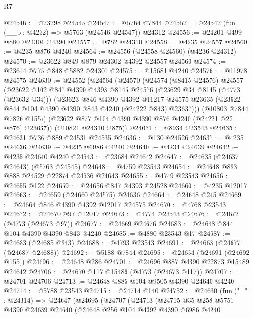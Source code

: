 \begin{lexlean}{R7}
\begin{coremodule}
@24546 := @23298 @24545
@24547 := @5764 @7844
@24552 := @24542 (fun (__b : @4232) => @5763 (@24546 @24547)) @24312
@24556 := @24201 @499 @880 @24304 @4390
@24557 := @782 @24310
@24558 := @4235 @24557
@24560 := @4235 @876 @4240
@24564 := @24556 (@24558 @24560) (@4236 @24312)
@24570 := @23622 @849 @879 @24302 @4392 @24557 @24560
@24574 := @23614 @775 @848 @5882 @24301
@24575 := @15681 @4240
@24576 := @11978 @24575
@24630 := @24552
    (@24564
      (@24570
        (@24574
          (@8415 @24576)
          @24557
          (@23622
            @102
            @847
            @4390
            @4393
            @8145
            @24576
            (@23629 @34 @8145 (@4773 (@23632 @34)))
            (@23623
              @846
              @4390
              @4392
              @11217
              @24575
              @23635
              (@23622 @844 @104 @4390 @4390 @843 @4240 (@24222 @843) @23637)))
          (@10803 @7844 @7826 @155))
        (@23622 @877 @104 @4390 @4390 @876 @4240 (@24221 @22 @876) @23637))
      (@10821 @24310 @875))
@24631 := @8934 @23543
@24635 := @24631 @736 @889 @24531 @24535
@24636 := @130 @24526
@24637 := @4235 @24636
@24639 := @4235 @6986 @4240
@24640 := @4234 @24639
@24642 := @4235 @24640 @4240
@24643 := @23684 @24642
@24647 := @24635 (@24637 @24643) (@5763 @24545)
@24648 := @4759 @23543
@24654 := @24648 @883 @888 @24529 @22874 @24636 @24643
@24655 := @4749 @23543
@24656 := @24655 @122
@24659 := @24656 @847 @4393 @24528
@24660 := @4235 @12017
@24663 := @24659 (@24660 @24575) @24636
@24664 := @24648 @245
@24669 := @24664 @846 @4390 @4392 @12017 @24575
@24670 := @4768 @23543
@24672 := @24670 @97 @12017
@24673 := @4774 @23543
@24676 := @24672 (@4773 (@24673 @97))
@24677 := @24669 @24676
@24683 := @24648 @844 @104 @4390 @4390 @843 @4240
@24685 := @4880 @23543 @17
@24687 := @24683 (@24685 @843)
@24688 := @4793 @23543
@24691 := @24663 (@24677 (@24687 @24688))
@24692 := @5188 @7844
@24695 := @24654 (@24691 (@24692 @155))
@24696 := @24648 @286
@24701 := @24696 @887 @4390 @22873 @15489 @24642
@24706 := @24670 @117 @15489 (@4773 (@24673 @117))
@24707 := @24701 @24706
@24713 := @24648 @885 @104 @9505 @4390 @24640 @4240
@24714 := @5788 @23543
@24715 := @24714 @140
@24752 := @24630
    (fun ("_" : @24314) =>
    @24647
      (@24695
        (@24707
          (@24713
            (@24715
              @35
              @258
              @5751
              @4390
              @24639
              @24640
              (@24648
                @256
                @104
                @4392
                @4390
                @6986
                @4240

\end{coremodule}
\end{lexlean}

